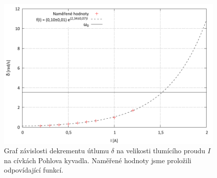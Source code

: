 \documentclass[english]{article}
\begin{document}
	\begin{figure}[h]
	\begin{center}
	\vspace*{-1cm}
		\includegraphics[width=\linewidth]{../gnuplot/10_pohl_dekrementy.pdf}
	\vspace*{-1cm}
			\caption{Graf závislosti dekrementu útlumu $\delta$ na velikosti tlumícího proudu $I$ na cívkách Pohlova kyvadla. Naměřené hodnoty jsme proložili odpovídající funkcí.}
			\label{fig:pohl_dekrementy}
	\end{center}
	\end{figure}						
	
\end{document}
